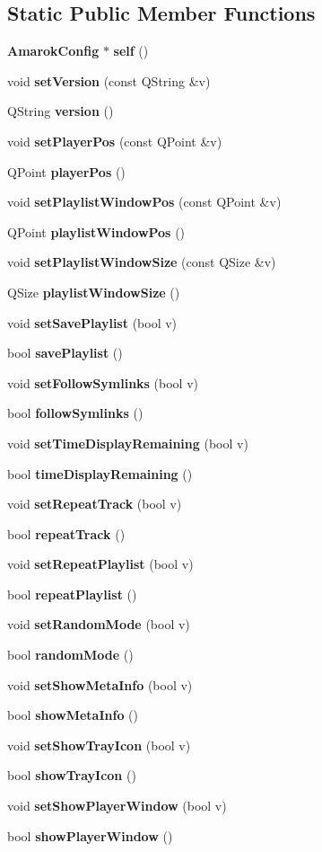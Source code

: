 \subsection*{Static Public Member Functions}
\begin{CompactItemize}
\item 
{\bf Amarok\-Config} $\ast$ {\bf self} ()
\item 
void {\bf set\-Version} (const QString \&v)
\item 
QString {\bf version} ()
\item 
void {\bf set\-Player\-Pos} (const QPoint \&v)
\item 
QPoint {\bf player\-Pos} ()
\item 
void {\bf set\-Playlist\-Window\-Pos} (const QPoint \&v)
\item 
QPoint {\bf playlist\-Window\-Pos} ()
\item 
void {\bf set\-Playlist\-Window\-Size} (const QSize \&v)
\item 
QSize {\bf playlist\-Window\-Size} ()
\item 
void {\bf set\-Save\-Playlist} (bool v)
\item 
bool {\bf save\-Playlist} ()
\item 
void {\bf set\-Follow\-Symlinks} (bool v)
\item 
bool {\bf follow\-Symlinks} ()
\item 
void {\bf set\-Time\-Display\-Remaining} (bool v)
\item 
bool {\bf time\-Display\-Remaining} ()
\item 
void {\bf set\-Repeat\-Track} (bool v)
\item 
bool {\bf repeat\-Track} ()
\item 
void {\bf set\-Repeat\-Playlist} (bool v)
\item 
bool {\bf repeat\-Playlist} ()
\item 
void {\bf set\-Random\-Mode} (bool v)
\item 
bool {\bf random\-Mode} ()
\item 
void {\bf set\-Show\-Meta\-Info} (bool v)
\item 
bool {\bf show\-Meta\-Info} ()
\item 
void {\bf set\-Show\-Tray\-Icon} (bool v)
\item 
bool {\bf show\-Tray\-Icon} ()
\item 
void {\bf set\-Show\-Player\-Window} (bool v)
\item 
bool {\bf show\-Player\-Window} ()
\item 

\end{CompactItemize}
